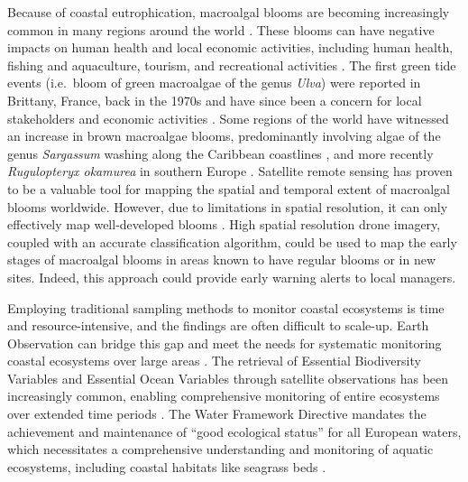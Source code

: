 \documentclass[
  number]{elsarticle}
\begin{document}
Because of coastal eutrophication, macroalgal blooms are becoming
increasingly common in many regions around the world \citetext{\citealp[
]{sutton2011european}; \citealp{ye2011green}}. These blooms can have
negative impacts on human health and local economic activities,
including human health, fishing and aquaculture, tourism, and
recreational activities \citetext{\citealp[
]{villares1999nitrogen}; \citealp{ye2011green}}. The first green tide
events (i.e.~bloom of green macroalgae of the genus \emph{Ulva}) were
reported in Brittany, France, back in the 1970s and have since been a
concern for local stakeholders and economic activities
\citep{menesguen2018marees}. Some regions of the world have witnessed an
increase in brown macroalgae blooms, predominantly involving algae of
the genus \emph{Sargassum} washing along the Caribbean coastlines
\citep{louime2017sargassum}, and more recently \emph{Rugulopteryx
okamurea} in southern Europe \citep{Roca2022}. Satellite remote sensing
has proven to be a valuable tool for mapping the spatial and temporal
extent of macroalgal blooms worldwide. However, due to limitations in
spatial resolution, it can only effectively map well-developed blooms
\citetext{\citealp[ ]{rs13081408}; \citealp[
]{klemas2012remote}; \citealp{haro2023biointertidal}}. High spatial
resolution drone imagery, coupled with an accurate classification
algorithm, could be used to map the early stages of macroalgal blooms in
areas known to have regular blooms or in new sites. Indeed, this
approach could provide early warning alerts to local managers.

Employing traditional sampling methods to monitor coastal ecosystems is
time and resource-intensive, and the findings are often difficult to
scale-up. Earth Observation can bridge this gap and meet the needs for
systematic monitoring coastal ecosystems over large areas
\citep{papathanasopoulou2019satellite}. The retrieval of Essential
Biodiversity Variables and Essential Ocean Variables through satellite
observations has been increasingly common, enabling comprehensive
monitoring of entire ecosystems over extended time periods
\citetext{\citealp[ ]{ratnarajah2023monitoring}; \citealp{Zoffoli2021}}.
The Water Framework Directive \citep{WFD2000} mandates the achievement
and maintenance of ``good ecological status'' for all European waters,
which necessitates a comprehensive understanding and monitoring of
aquatic ecosystems, including coastal habitats like seagrass beds
\citetext{\citealp[ ]{foden2007angiosperms}; \citealp[
]{nordlund2024one}; \citealp{Zoffoli2021}}.
\end{document}
